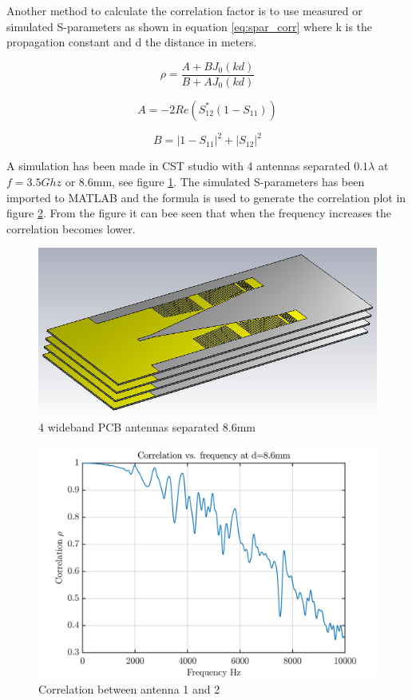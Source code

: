 Another method to calculate the correlation factor is to use measured or simulated S-parameters as shown in equation \ref{eq:spar_corr} \citep{wang2011} where k is the propagation constant and d the distance in meters. 

\begin{equation} \label{eq:spar_corr}
\rho = \frac{A+B J_0(kd)}{B+A J_0(kd)}
\end{equation}

\begin{equation} 
A = -2Re(S_{12}^*(1-S_{11}))
\end{equation}

\begin{equation} 
B = |1-S_{11}|^2 + |S_{12}|^2
\end{equation}

A simulation has been made in CST studio with 4 antennas separated $0.1\lambda$ at $f = 3.5Ghz$ or 8.6mm, see figure \ref{fig:correlation}. The simulated S-parameters has been imported to MATLAB and the formula is used to generate the correlation plot in figure \ref{fig:correlation_plot}. From the figure it can bee seen that when the frequency increases the correlation becomes lower. 


\begin{figure}[H]
\centering 
\includegraphics[scale = 0.7]{figures/ch1/antenna_array.png}
\caption{4 wideband PCB antennas separated 8.6mm }
\label{fig:correlation}
\end{figure}

\begin{figure}[H]
\centering 
\includegraphics[scale = 0.9]{figures/ch1/antenna_array_corr.png}
\caption{Correlation between antenna 1 and 2}
\label{fig:correlation_plot}
\end{figure}

